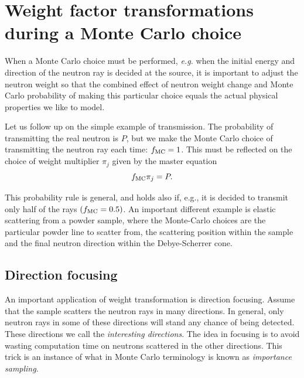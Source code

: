 \section{Weight factor transformations during a Monte Carlo
 choice}
When a Monte Carlo choice must be performed, {\em e.g.} when the
initial energy and direction of the neutron ray is decided at the source,
it is important to adjust the neutron weight so that the combined
effect of neutron weight change and Monte Carlo probability
of making this particular choice
equals the actual physical properties we like to model.

Let us follow up on the simple example of transmission.
The probability of transmitting the real neutron is $P$, but we make
the Monte Carlo choice of transmitting the neutron ray each time:
$f_{\rm MC}=1$. This must be reflected on the choice of weight multiplier
$\pi_j$ given by the master equation
\begin{equation} \label{probrule}
f_{\rm MC} \pi_j = P .
\end{equation}

This probability rule is general, and holds also if, e.g., it is decided to
transmit only half of the rays $(f_{\rm MC}=0.5)$.
An important different example
is elastic scattering from a powder sample,
where the Monte-Carlo choices are the particular powder line to scatter from,
the scattering position within the sample and the final neutron direction
within the Debye-Scherrer cone.

\subsection{Direction focusing}
\label{s:focus}
An important application of weight transformation is direction focusing.
Assume that the sample scatters the neutron rays in many directions.
In general, only neutron rays in some of these directions will
stand any chance of being detected. These directions we call
the {\em interesting directions}.
The idea in focusing is to avoid wasting computation time on
neutrons scattered in the other directions.
This trick is an instance of what in Monte Carlo terminology
is known as {\em importance sampling}. %

